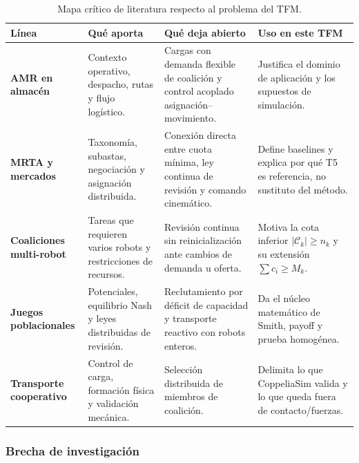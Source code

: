 \begin{table}[H]
\centering
\small
\renewcommand{\arraystretch}{1.14}
\caption[Mapa crítico de literatura]{Mapa crítico de literatura respecto al problema del TFM.}
\label{tab:mapa_literatura_gap}
\begin{tabularx}{\textwidth}{@{}>{\bfseries}p{}YYY@{}}
\toprule
\textbf{Línea} & \textbf{Qué aporta} & \textbf{Qué deja abierto} & \textbf{Uso en este TFM} \\
\midrule
AMR en almacén & Contexto operativo, despacho, rutas y flujo logístico. &
  Cargas con demanda flexible de coalición y control acoplado asignación--movimiento. &
  Justifica el dominio de aplicación y los supuestos de simulación. \\
MRTA y mercados & Taxonomía, subastas, negociación y asignación distribuida. &
  Conexión directa entre cuota mínima, ley continua de revisión y comando cinemático. &
  Define baselines y explica por qué T5 es referencia, no sustituto del método. \\
Coaliciones multi-robot & Tareas que requieren varios robots y restricciones de recursos. &
  Revisión continua sin reinicialización ante cambios de demanda u oferta. &
  Motiva la cota inferior $|\mathcal{C}_k|\ge n_k$ y su extensión $\sum c_i\ge M_k$. \\
Juegos poblacionales & Potenciales, equilibrio Nash y leyes distribuidas de revisión. &
  Reclutamiento por déficit de capacidad y transporte reactivo con robots enteros. &
  Da el núcleo matemático de Smith, payoff y prueba homogénea. \\
Transporte cooperativo & Control de carga, formación física y validación mecánica. &
  Selección distribuida de miembros de coalición. &
  Delimita lo que CoppeliaSim valida y lo que queda fuera de contacto/fuerzas. \\
\bottomrule
\end{tabularx}
\end{table}



\subsubsection{Brecha de investigación}

